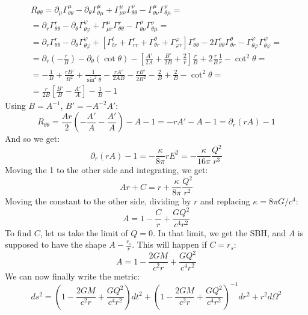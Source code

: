 \documentclass{article}
\begin{document}
\begin{equation}
\begin{gathered}
    R_{\theta\theta} =
    \partial_\mu \Gamma^\mu_{\theta\theta} - \partial_\theta \Gamma^{\mu}_{\theta\mu} + \Gamma^{\mu}_{\mu\nu}\Gamma^{\nu}_{\theta\theta} - \Gamma^{\mu}_{\theta\nu}\Gamma^{\nu}_{\theta\mu} = \\ =
    \partial_r \Gamma^r_{\theta\theta} - \partial_\theta \Gamma^{\varphi}_{\theta\varphi} + \Gamma^\mu_{\mu r}\Gamma^{r}_{\theta\theta}
    - \Gamma^\mu_{\theta \nu}\Gamma^{\nu}_{\theta\mu} = \\ =
    \partial_r \Gamma^r_{\theta\theta} - \partial_\theta \Gamma^{\varphi}_{\theta\varphi} + \left[
        \Gamma^t_{t r} +
        \Gamma^r_{r r} +
        \Gamma^\theta_{\theta r} +
        \Gamma^\varphi_{\varphi r}
    \right]\Gamma^{r}_{\theta\theta}
    - 2\Gamma^r_{\theta \theta}\Gamma^{\theta}_{\theta r}
    - \Gamma^\varphi_{\theta\varphi}\Gamma^\varphi_{\theta\varphi} = \\ =
    \partial_r \left(-\frac{r}{B}\right) - \partial_\theta(\cot\theta) - \left[
        \frac{A'}{2A} +
        \frac{B'}{2B} +
        \frac{2}{r}
    \right]\frac{r}{B}
    + 2\frac{r}{B}\frac{1}{r}
    -\cot^2\theta = \\ =
    -\frac{1}{B} + \frac{rB'}{B^2} + \frac{1}{\sin^2\theta} -
        \frac{rA'}{2AB} -
        \frac{rB'}{2B^2} -
        \frac{2}{B}
    + \frac{2}{B} - \cot^2\theta = \\ =
    \frac{r}{2B}\left[\frac{B'}{B} - \frac{A'}{A}\right] - \frac{1}{B} - 1
\end{gathered}
\end{equation}
Using $B = A^{-1}$, $B' = -A^{-2}A'$:
\begin{equation}
    R_{\theta\theta} =
    \frac{Ar}{2}\left(-\frac{A'}{A} - \frac{A'}{A}\right) - A - 1 = - rA' - A - 1 = \partial_r(rA) - 1 
\end{equation}
And so we get:
\begin{equation}
    \partial_r(rA) - 1 = -\frac{\kappa}{8\pi}rE^2 = -\frac{\kappa}{16\pi}\frac{Q^2}{r^3}
\end{equation}
Moving the 1 to the other side and integrating, we get:
\begin{equation}
    Ar + C = r + \frac{\kappa}{8\pi}\frac{Q^2}{r^2}
\end{equation}
Moving the constant to the other side, dividing by $r$ and replacing $\kappa = 8\pi G / c^4$:
\begin{equation}
    A = 1 - \frac{C}{r} + \frac{G Q^2}{c^4r^2}
\end{equation}
To find $C$, let us take the limit of $Q = 0$. In that limit, we get the SBH, and $A$ is supposed to have the shape $A - \frac{r_s}{r}$. This will happen if $C = r_s$:
\begin{equation}
    A = 1 - \frac{2GM}{c^2r} + \frac{G Q^2}{c^4r^2}
\end{equation}
We can now finally write the metric:
\begin{equation}
\label{eq:final-metric}
    ds^2 = \left(1 - \frac{2GM}{c^2r} + \frac{G Q^2}{c^4r^2}\right)dt^2 + \left(1 - \frac{2GM}{c^2r} + \frac{G Q^2}{c^4r^2}\right)^{-1}dr^2 + r^2d\Omega^2
\end{equation}
\end{document}
